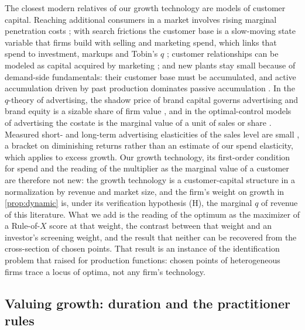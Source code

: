 The closest modern relatives of our growth technology are models of customer capital. Reaching additional consumers in a market involves rising marginal penetration costs \citep{arkolakis2010market}; with search frictions the customer base is a slow-moving state variable that firms build with selling and marketing spend, which links that spend to investment, markups and Tobin's $q$ \citep{gourio2014customer}; customer relationships can be modeled as capital acquired by marketing \citep{drozd2012understanding}; and new plants stay small because of demand-side fundamentals: their customer base must be accumulated, and active accumulation driven by past production dominates passive accumulation \citep{foster2016slow}. In the $q$-theory of advertising, the shadow price of brand capital governs advertising and brand equity is a sizable share of firm value \citep{vitorino2014understanding,belo2022decomposing}, and in the optimal-control models of advertising the costate is the marginal value of a unit of sales or share \citep{sethi1973optimal,sethi1977dynamic,feichtinger1994dynamic}. Measured short- and long-term advertising elasticities of the sales level are small \citep{sethuraman2011advertising}, a bracket on diminishing returns rather than an estimate of our spend elasticity, which applies to excess growth. Our growth technology, its first-order condition for spend and the reading of the multiplier as the marginal value of a customer are therefore not new: the growth technology is a customer-capital structure in a normalization by revenue and market size, and the firm's weight on growth in \autoref{prop:dynamic} is, under its verification hypothesis (H), the marginal $q$ of revenue of this literature. What we add is the reading of the optimum as the maximizer of a Rule-of-$X$ score at that weight, the contrast between that weight and an investor's screening weight, and the result that neither can be recovered from the cross-section of chosen points. That result is an instance of the identification problem that \citet{marschak1944random} raised for production functions: chosen points of heterogeneous firms trace a locus of optima, not any firm's technology.

\subsection{Valuing growth: duration and the practitioner rules}

